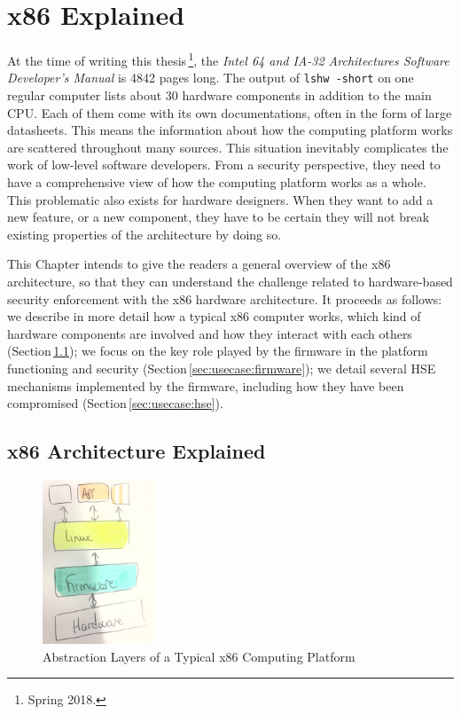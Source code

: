 \chapter{x86 Explained}
\label{chapter:usecase}


At the time of writing this thesis\,\footnote{Spring 2018.}, the \emph{Intel 64
  and IA-32 Architectures Software Developer’s Manual} is 4842 pages long.
%
The output of \texttt{lshw -short} on one regular computer lists about 30
hardware components in addition to the main CPU.
%
Each of them come with its own documentations, often in the form of large
datasheets.
%
This means the information about how the computing platform works are scattered
throughout many sources.
%
This situation inevitably complicates the work of low-level software developers.
%
From a security perspective, they need to have a comprehensive view of how the
computing platform works as a whole.
%
This problematic also exists for hardware designers.
%
When they want to add a new feature, or a new component, they have to be certain
they will not break existing properties of the architecture by doing so.

This Chapter intends to give the readers a general overview of the x86
architecture, so that they can understand the challenge related to
hardware-based security enforcement with the x86 hardware architecture.
%
It proceeds as follows:
%
we describe in more detail how a typical x86 computer works, which kind of
hardware components are involved and how they interact with each others
(Section\,\ref{sec:usecase:architecture});
%
we focus on the key role played by the firmware in the platform functioning and
security (Section\,\ref{sec:usecase:firmware});
%
we detail several HSE mechanisms implemented by the firmware, including how they
have been compromised (Section\,\ref{sec:usecase:hse}).

\section{x86 Architecture Explained}
\label{sec:usecase:architecture}

\begin{figure}
  \centering
  \includegraphics[width=0.3\textwidth]{Figures/computing-platform-1.jpg}
  \caption{Abstraction Layers of a Typical x86 Computing Platform}
  \label{fig:usecase:computing-platform}
\end{figure}

